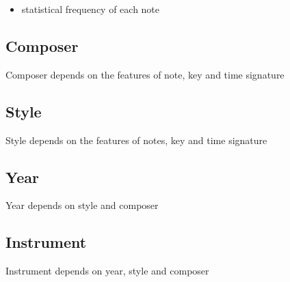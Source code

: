 \documentclass[a4paper,12pt]{article}
\begin{document}
\begin{itemize}
    \item statistical frequency of each note 
\end{itemize}

\subsection{Composer}

Composer depends on the features of note, key and time signature

\subsection{Style}

Style depends on the features of notes, key and time signature

\subsection{Year}

Year depends on style and composer

\subsection{Instrument}

Instrument depends on year, style and composer


\end{document}
